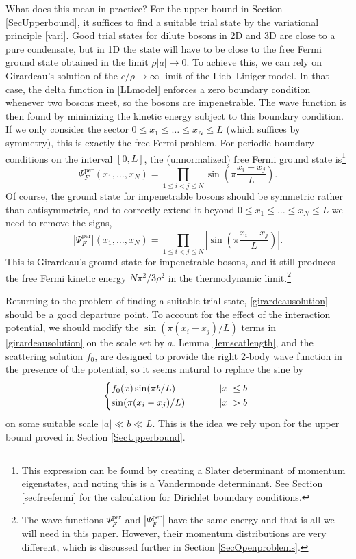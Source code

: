 \documentclass[a4paper,11pt]{article}
\newcommand{\abs}[1]{\left\lvert #1 \right\rvert}
\numberwithin{equation}{section}
\begin{document}
What does this mean in practice? For the upper bound in Section \ref{SecUpperbound}, it suffices to find a suitable trial state by the variational principle \eqref{vari}. Good trial states for dilute bosons in 2D and 3D are close to a pure condensate, but in 1D the state will have to be close to the free Fermi ground state obtained in the limit $\rho|a|\to0$. To achieve this, we can rely on Girardeau's solution \cite{girardeau1960relationship} of the $c/\rho\to\infty$ limit of the Lieb--Liniger model. In that case, the delta function in \eqref{LLmodel} enforces a zero boundary condition whenever two bosons meet, so the bosons are impenetrable. The wave function is then found by minimizing the kinetic energy subject to this boundary condition. If we only consider the sector $0\leq x_1\leq\dots\leq x_N\leq L$ (which suffices by symmetry), this is exactly the free Fermi problem. For periodic boundary conditions on the interval $[0,L]$, the (unnormalized) free Fermi ground state is\footnote{This expression can be found by creating a Slater determinant of momentum eigenstates, and noting this is a Vandermonde determinant. See Section \ref{secfreefermi} for the calculation for Dirichlet boundary conditions.}
\begin{equation}
\label{fermisolution}
\Psi^{\text{per}}_F(x_1,\dots,x_N)=\prod_{1\leq i<j\leq N}\sin\left(\pi\frac{x_i-x_j}{L}\right).
\end{equation}
Of course, the ground state for impenetrable bosons should be symmetric rather than antisymmetric, and to correctly extend it beyond $0\leq x_1\leq\dots\leq x_N\leq L$ we need to remove the signs,
\begin{equation}
\label{girardeausolution}
\abs{\Psi^{\text{per}}_F}(x_1,\dots,x_N)=\prod_{1\leq i<j\leq N}\abs{\sin\left(\pi\frac{x_i-x_j}{L}\right)}.
\end{equation}
This is Girardeau's ground state for impenetrable bosons, and it still produces the free Fermi kinetic energy $N\pi^2/3\rho^2$ in the thermodynamic limit.\footnote{The wave functions $\Psi^{\text{per}}_F$ and $|\Psi^{\text{per}}_F|$ have the same energy and that is all we will need in this paper. However, their momentum distributions are very different, which is discussed further in Section \ref{SecOpenproblems}.\label{momremark}} 

Returning to the problem of finding a suitable trial state, \eqref{girardeausolution} should be a good departure point. To account for the effect of the interaction potential, we should modify the $\sin(\pi(x_i-x_j)/L)$ terms in \eqref{girardeausolution} on the scale set by $a$. Lemma \ref{lemscatlength}, and the scattering solution $f_0$, are designed to provide the right 2-body wave function in the presence of the potential, so it seems natural to replace the sine by
\begin{equation}
\label{trialidea}
\begin{cases*}
f_0(x)\sin(\pi b/L)& \phantom{when} $|x|\leq b$\\
\sin(\pi(x_i-x_j)/L)& \phantom{when} $|x|> b$
\end{cases*}
\end{equation}
on some suitable scale $\abs{a}\ll b\ll L$. This is the idea we rely upon for the upper bound proved in Section \ref{SecUpperbound}. 
\end{document}

